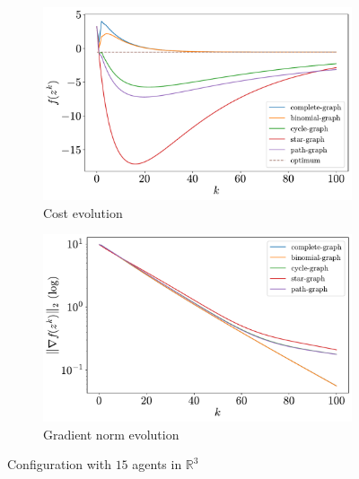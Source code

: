 \documentclass[a4paper,11pt,oneside]{book}
\begin{document}
\begin{figure}[H]
      \centering
      \begin{subfigure}[t]{0.49\textwidth}
            \centering
            \includegraphics[width=\linewidth]{./figs/quadratic/cost_15_3_100.pdf} 
            \caption{Cost evolution}
      \end{subfigure}
      \hfill
      \begin{subfigure}[t]{0.49\textwidth}
            \centering
            \includegraphics[width=\linewidth]{./figs/quadratic/gradient_15_3_100.pdf} 
            \caption{Gradient norm evolution}
      \end{subfigure}
      \caption{Configuration with $15$ agents in $\mathbb{R}^{3}$}
\end{figure}
\end{document}
